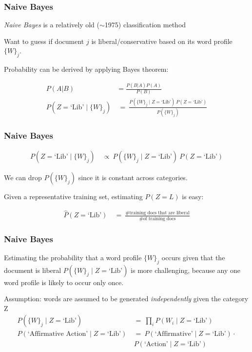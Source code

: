 \documentclass[11pt,compress,professionalfonts]{beamer}
\begin{document}
\begin{frame}[t,fragile]\frametitle{Naive Bayes}

\textsl{Naive Bayes} is a relatively old ($\sim$1975)  classification method

Want to guess if document $j$ is liberal/conservative based on its word profile $\{W\}_j$.

Probability can be derived by applying Bayes theorem:

\begin{align*}
P(A | B) &= \frac{P(B | A) P(A)}{P(B)}\\
P(Z=\text{`Lib'} \mid \{W\}_j) &~=~ \frac{P(\{W\}_j \mid Z=\text{`Lib'})~P(Z=\text{`Lib'})}{P(\{W\}_j)}
\end{align*}

\end{frame}
\begin{frame}[t,fragile]\frametitle{Naive Bayes}

\begin{align*}
P(Z=\text{`Lib'} \mid \{W\}_j) &~\propto~ P(\{W\}_j \mid Z=\text{`Lib'})~P(Z=\text{`Lib'})
\end{align*}

We can drop $P(\{W\}_j)$ since it is constant across categories.

Given a representative training set, estimating $P(Z=L)$ is easy:

\begin{align*}
\hat{P}(Z=\text{`Lib'})&~=~ \frac{\text{\# training docs that are liberal}}
{\text{\# of training docs}}
\end{align*}

\end{frame}
\begin{frame}[t,fragile]\frametitle{Naive Bayes}

Estimating the probability that a word profile $\{W\}_j$ occurs given that the document is liberal $P(\{W\}_j\mid Z=\text{`Lib'})$ is more challenging, because any one word profile is likely to occur only once.

Assumption: words are assumed to be generated \textit{independently} given the category Z 
\begin{align*}
P(\{W\}_j \mid Z=\text{`Lib'}) &~=~ {\prod}_i P(W_i \mid Z=\text{`Lib'})\\
P( \text{`Affirmative Action'} \mid Z=\text{`Lib'}) &~=~ P( \text{`Affirmative'} \mid Z=\text{`Lib'}) \cdot\\
& ~  P( \text{`Action'} \mid Z=\text{`Lib'})
\end{align*}


\end{frame}
\end{document}
